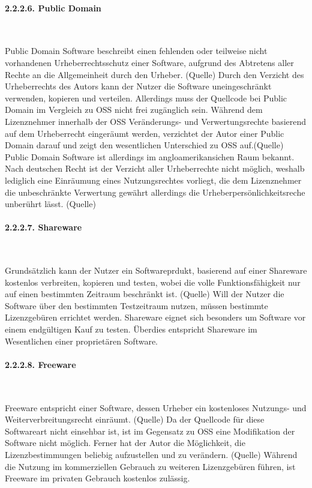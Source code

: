 \paragraph{2.2.2.6. Public Domain}$~$

Public Domain Software beschreibt einen fehlenden oder teilweise nicht vorhandenen Urheberrechtsschutz einer Software, aufgrund des Abtretens aller Rechte an die Allgemeinheit durch den Urheber. (Quelle) Durch den Verzicht des Urheberrechts des Autors kann der Nutzer die Software uneingeschränkt verwenden, kopieren und verteilen. Allerdings muss der Quellcode bei Public Domain im Vergleich zu OSS nicht frei zugänglich sein.  Während dem Lizenznehmer innerhalb der OSS Veränderungs- und Verwertungsrechte basierend auf dem Urheberrecht eingeräumt werden, verzichtet der Autor einer Public Domain darauf und zeigt den wesentlichen Unterschied zu OSS auf.(Quelle) Public Domain Software ist allerdings im angloamerikansichen Raum bekannt. Nach deutschen Recht ist der Verzicht aller Urheberrechte nicht möglich, weshalb lediglich eine Einräumung eines Nutzungsrechtes vorliegt, die dem Lizenznehmer die unbeschränkte Verwertung gewährt allerdings die Urheberpersönlichkeitsreche unberührt lässt. (Quelle)

\paragraph{2.2.2.7. Shareware}$~$

Grundsätzlich kann der Nutzer ein Softwareprdukt, basierend auf einer Shareware kostenlos verbreiten, kopieren und testen, wobei die volle Funktionsfähigkeit nur auf einen bestimmten Zeitraum beschränkt ist. (Quelle) Will der Nutzer die Software über den bestimmten Testzeitraum nutzen, müssen bestimmte Lizenzgebüren errichtet werden. Shareware eignet sich besonders um Software vor einem endgültigen Kauf zu testen. Überdies entspricht Shareware im Wesentlichen einer proprietären Software.

\paragraph{2.2.2.8. Freeware}$~$

Freeware entspricht einer Software, dessen Urheber ein kostenloses Nutzungs- und Weiterverbreitungsrecht einräumt. (Quelle) Da der Quellcode für diese Softwareart nicht einsehbar ist, ist im Gegensatz zu OSS eine Modifikation der Software nicht möglich. Ferner hat der Autor die Möglichkeit, die Lizenzbestimmungen beliebig aufzustellen und zu verändern. (Quelle) Während die Nutzung im kommerziellen Gebrauch zu weiteren Lizenzgebüren führen, ist Freeware im privaten Gebrauch kostenlos zulässig.\\

